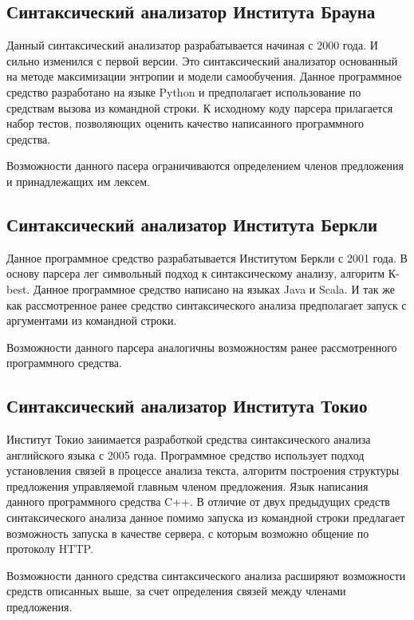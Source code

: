 \documentclass{standalone}
\begin{document}
\subsection{Синтаксический анализатор Института Брауна}

\par Данный синтаксический анализатор разрабатывается начиная с 2000 года. И сильно изменился с первой версии. Это синтаксический анализатор основанный на методе максимизации энтропии и модели самообучения. Данное программное средство разработано на языке Python и предполагает использование по средствам вызова из командной строки. К исходному коду парсера прилагается набор тестов, позволяющих оценить качество написанного программного средства.
\par Возможности данного пасера ограничиваются определением членов предложения и принадлежащих им лексем.

\subsection{Синтаксический анализатор Института Беркли}

\par Данное программное средство разрабатывается Институтом Беркли с 2001 года. В основу парсера лег символьный подход к синтаксическому анализу, алгоритм К-best. Данное программное средство написано на языках Java и Scala. И так же как рассмотренное ранее средство синтаксического анализа предполагает запуск с аргументами из командной строки.
\par Возможности данного парсера аналогичны возможностям ранее рассмотренного программного средства.

\subsection{Синтаксический анализатор Института Токио}

\par Институт Токио занимается разработкой средства синтаксического анализа английского языка с 2005 года. Программное средство использует подход установления связей в процессе анализа текста, алгоритм построения структуры предложения управляемой главным членом предложения. Язык написания данного программного средства C++. В отличие от двух предыдущих средств синтаксического анализа данное помимо запуска из командной строки предлагает возможность запуска в качестве сервера, с которым возможно общение по протоколу HTTP.
\par Возможности данного средства синтаксического анализа расширяют возможности средств описанных выше, за счет определения связей между членами предложения.
\end{document}
